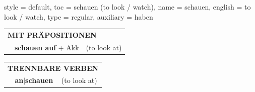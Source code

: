 \begin{verbentry}{
  style = {default},
  toc = {schauen (to look / watch)},
  name = {schauen},
  english = {to look / watch},
  type = {regular},
  auxiliary = {haben}
}
\vspace{10pt}

\begin{tabular}{lll}
\multicolumn{3}{l}{\textbf{MIT PRÄPOSITIONEN}}\\
& \textbf{schauen auf} + Akk & (to look at)\\
\end{tabular}
\hfill
\begin{tabular}{lll}
\multicolumn{3}{l}{\textbf{TRENNBARE VERBEN}}\\
& \textbf{an$|$schauen} & (to look at)\\
\end{tabular}

\vspace{-5pt}
\end{verbentry}

